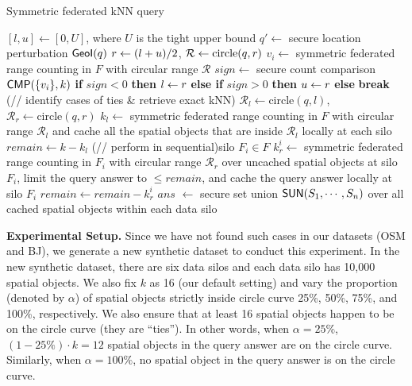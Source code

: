 \setlength{\textfloatsep}{1ex}
\setlength{\floatsep}{1ex}
\begin{algorithm}[t]
	\caption{\small{Symmetric federated kNN query}}\label{alg:tie-knn}
    $[l,u] \gets [0,U]$, where $U$ is the tight upper bound\;
    $q' \gets$ secure location perturbation $\textsf{GeoI}(q)$\;
     {
        $r \leftarrow (l+u)/2$, $\mathcal{R} \gets \text{circle}(q, r)$\;
        $v_i \gets$ symmetric federated range counting in $F$ with circular range $\mathcal{R}$\; 
        $sign \gets$ secure count comparison $\textsf{CMP}(\{v_i\}, k)$\;
        \textbf{if} $sign < 0$ \textbf{then} $l \leftarrow r$\;
        \textbf{else if} $sign > 0$ \textbf{then} $u \leftarrow r$\;
        \textbf{else} \textbf{break}\;
    }
    \Else(// identify cases of ties \& retrieve exact kNN){
        $\mathcal{R}_l \gets \text{circle}(q, l)$,
        $\mathcal{R}_r \gets \text{circle}(q, r)$\;
        $k_{l} \gets$ symmetric federated range counting in $F$ with circular range $\mathcal{R}_l$ and cache all the spatial objects that are inside $\mathcal{R}_l$ locally at each silo\;
        $remain \gets k - k_{l}$\; 
        \ForEach(// perform in sequential){silo $F_i \in F$}{ 
            $k_r^i \gets$ symmetric federated range counting in $F_i$ with circular range $\mathcal{R}_r$ over uncached spatial objects at silo $F_i$, limit the query answer to $\le remain$, and cache the query answer locally at silo $F_i$\;
            $remain \gets remain - k_r^i$\;
        }
        $ans$ $\gets$ secure set union $\textsf{SUN}(S_1,\cdots,S_n)$ over all cached spatial objects within each data silo\;
    }
    \;
\end{algorithm}
\afterpage{\global\setlength{\textfloatsep}{\oldtextfloatsep}}
\afterpage{\global\setlength{\floatsep}{\oldfloatsep}}

\textbf{Experimental Setup.}
Since we have not found such cases in our datasets (OSM and BJ), we generate a new synthetic dataset to conduct this experiment.
In the new synthetic dataset, there are six data silos and each data silo has 10,000 spatial objects.
We also fix $k$ as 16 (\ie our default setting) and vary the proportion (denoted by $\alpha$) of spatial objects strictly inside circle curve 25\%, 50\%, 75\%, and 100\%, respectively.
We also ensure that at least 16 spatial objects happen to be on the circle curve (\ie they are ``ties'').
In other words, when $\alpha=25\%$, $(1-25\%) \cdot k = 12$ spatial objects in the query answer are on the circle curve.
Similarly, when $\alpha=100\%$, no spatial object in the query answer is on the circle curve.

